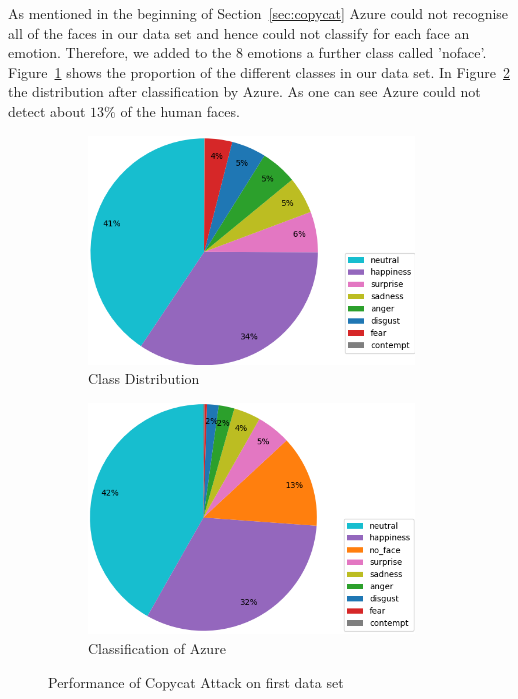 \documentclass[a4paper,11pt]{article}
\begin{document}
       As mentioned in the beginning of Section~\ref{sec:copycat} Azure could not recognise all of the faces in our data set and hence could not classify for each face an emotion. Therefore, we added to the 8 emotions a further class called 'no\textunderscore face'. Figure~\ref{subfig:emotions_original-labels} shows the proportion of the different classes in our data set. In Figure~\ref{subfig:emotions_azure-labels} the distribution after classification by Azure. As one can see Azure could not detect about $13\%$ of the human faces.
       
       \begin{figure}[h!]
            \centering
            \begin{subfigure}[c]{0.45\textwidth}
                \centering
                \includegraphics[width=0.95\textwidth]{exercise_3/paper/images/emotions_original-labels.png}
                \caption{Class Distribution}
                \label{subfig:emotions_original-labels}
            \end{subfigure}
            \begin{subfigure}[c]{0.45\textwidth}
                \centering
                \includegraphics[width=0.95\textwidth]{exercise_3/paper/images/emotions_azure-labels.png}
                \caption{Classification of Azure}
                \label{subfig:emotions_azure-labels}
            \end{subfigure}
            \caption{Performance of Copycat Attack on first data set}
            \label{fig:emotions_distribution-labels}
        \end{figure}
        
\end{document}
